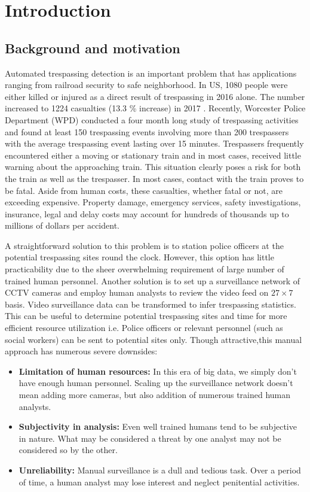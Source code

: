 \section{Introduction}

\subsection{Background and motivation}
Automated trespassing detection is an important problem that has applications ranging from railroad security to safe neighborhood. In US, 1080 people were either killed or injured as a direct result of trespassing in 2016 alone\cite{2017trespass}. The number increased to 1224 casualties (13.3 \% increase) in 2017 \cite{2018trespass}. Recently, Worcester Police Department (WPD) conducted a four month long study of trespassing activities and found at least 150 trespassing events involving more than 200 trespassers  with the average trespassing event lasting over 15 minutes. Trespassers frequently encountered either a moving or stationary train and in most cases, received little warning about the approaching train. This situation clearly poses a risk for both the train as well as the trespasser.
In most cases, contact with the train proves to
be fatal. Aside from human costs, these casualties, whether fatal or not, are exceeding expensive. Property damage, emergency services, safety investigations, insurance, legal and delay costs may account for hundreds of thousands up to millions of dollars per accident.

A straightforward solution to this problem is to station police officers at the potential trespassing sites round the clock. However, this option has little practicability due to the sheer overwhelming requirement of large number of trained human personnel. Another solution is to set up a surveillance network of CCTV cameras and employ human analysts to review the video feed on $27\times 7$ basis. Video surveillance data can be transformed to infer trespassing statistics. This can be useful to determine potential trespassing sites and time for more efficient resource utilization i.e. Police officers or relevant personnel (such as social workers) can be sent to potential sites only. Though attractive,this manual approach has numerous severe downsides:

\begin{itemize}
\item \textbf{Limitation of human resources:} 
In this era of big data, we simply don't have enough human personnel. Scaling up the surveillance network doesn't mean adding more cameras, but also addition of numerous trained human analysts. 

\item \textbf{Subjectivity in analysis:} Even well trained humans tend to be subjective in nature. What may be considered a threat by one analyst may not be considered so by the other. 

\item \textbf{Unreliability:} Manual surveillance is a dull and tedious task. Over a period of time, a human analyst may lose interest and neglect penitential activities.
\end{itemize}


